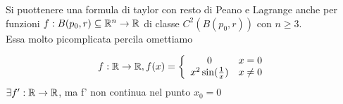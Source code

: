 \begin{osservazione}[BDPG,11.14]
  Si pu\aco ottenere una formula di taylor con resto di Peano e Lagrange anche per funzioni $f : B(p_0,r) \subseteq \mathbb{R}^n \to \mathbb{R}$
  di classe $C^2(B(p_0,r))$ con $n \geq 3$.\\
  Essa \ace molto pi\acu complicata perci\aco la omettiamo
\end{osservazione}
\begin{exercise}
  $$f : \mathbb{R} \to \mathbb{R}, f(x) = \left\{\begin{array}{cl}
    0 & x = 0 \\
    x^2 \sin(\frac{1}{x}) & x \neq 0 \\
  \end{array}\right.$$
  $\exists f' : \mathbb{R} \to \mathbb{R}$, ma f' non \ace continua nel punto $x_0=0$
\end{exercise}